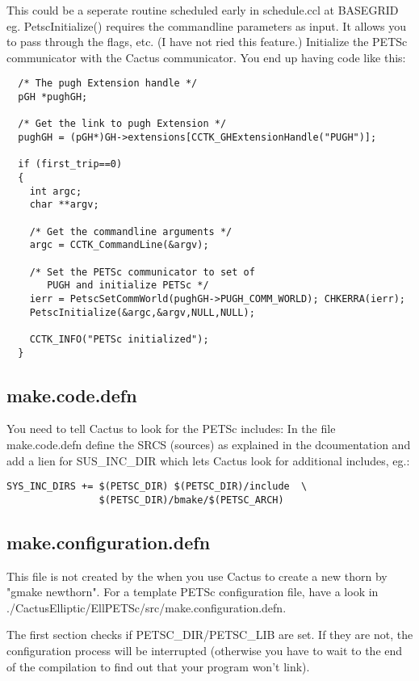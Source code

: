 \documentclass{article}
\begin{document}
This could be a seperate routine scheduled early in schedule.ccl at
BASEGRID eg. PetscInitialize() requires the commandline parameters
as input. It allows you to pass through the flags, etc. (I have not 
ried this feature.) Initialize the PETSc communicator with the Cactus
communicator. You end up having code like this:

\begin{verbatim}  
  /* The pugh Extension handle */	
  pGH *pughGH;
  
  /* Get the link to pugh Extension */
  pughGH = (pGH*)GH->extensions[CCTK_GHExtensionHandle("PUGH")];

  if (first_trip==0) 
  {
    int argc;
    char **argv;

    /* Get the commandline arguments */
    argc = CCTK_CommandLine(&argv);

    /* Set the PETSc communicator to set of 
       PUGH and initialize PETSc */
    ierr = PetscSetCommWorld(pughGH->PUGH_COMM_WORLD); CHKERRA(ierr);
    PetscInitialize(&argc,&argv,NULL,NULL);
    
    CCTK_INFO("PETSc initialized");
  }
\end{verbatim}

\subsection{make.code.defn}
You need to tell Cactus to look for the PETSc includes: 
In the file make.code.defn define the SRCS (sources) as explained in
the dcoumentation and add a lien for SUS\_INC\_DIR which lets Cactus
look for additional includes, eg.:
\begin{verbatim}
SYS_INC_DIRS += $(PETSC_DIR) $(PETSC_DIR)/include  \
                $(PETSC_DIR)/bmake/$(PETSC_ARCH)
\end{verbatim}

\subsection{make.configuration.defn}
This file is not created by the when you use Cactus to create a new
thorn by "gmake newthorn". For a template PETSc configuration file,
have a look in ./CactusElliptic/EllPETSc/src/make.configuration.defn.

The first section checks if PETSC\_DIR/PETSC\_LIB are set. If they are
not, the configuration process will be interrupted (otherwise you have 
to wait to the end of the compilation to find out that your program
won't link). 
\end{document}
